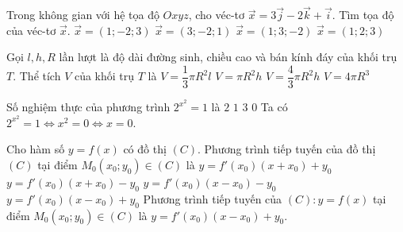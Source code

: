 \begin{ex}%
Trong không gian với hệ tọa độ $Oxyz$, cho véc-tơ $\vec{x}=3\vec{j}-2\vec{k}+\vec{i}$. Tìm tọa độ của véc-tơ $\vec{x}$.
\choice
{$\vec{x}=(1;-2;3)$}
{$\vec{x}=(3;-2;1)$}
{\True $\vec{x}=(1;3;-2)$}
{$\vec{x}=(1;2;3)$}
\end{ex}

\begin{ex}%
			Gọi $l,h,R$ lần lượt là độ dài đường sinh, chiều cao và bán kính đáy của khối trụ $T$. Thể tích $V$ của khối trụ $T$ là
			\choice
			{$V=\dfrac{1}{3}\pi R^2l$}
			{\True $V=\pi R^2h$}
			{$V=\dfrac{4}{3}\pi R^2h$}
			{$V=4\pi R^3$}
		\end{ex}
		
		\begin{ex}%
			Số nghiệm thực của phương trình $2^{x^2}=1$ là
			\choice
			{$2$}
			{\True $1$}
			{$3$}
			{$0$}
			\loigiai
			{
				Ta có $2^{x^2}=1 \Leftrightarrow x^2=0 \Leftrightarrow x=0$.
			}
		\end{ex}
		
		\begin{ex}%
			Cho hàm số $y=f(x)$ có đồ thị $(C)$. Phương trình tiếp tuyến của đồ thị $(C)$ tại điểm $M_0 \left(x_0;y_0\right) \in (C)$ là
			\choice
			{$y=f'\left(x_0\right)\left(x+x_0\right)+y_0$}
			{$y=f'\left(x_0\right)\left(x+x_0\right)-y_0$}
			{$y=f'\left(x_0\right)\left(x-x_0\right)-y_0$}
			{\True $y=f'\left(x_0\right)\left(x-x_0\right)+y_0$}
			\loigiai
			{
				Phương trình tiếp tuyến của $(C): y=f(x)$ tại điểm $M_0 \left(x_0;y_0\right) \in (C)$ là $y = f'\left(x_0\right)\left(x-x_0\right) + y_0$.
			}
		\end{ex}
		
